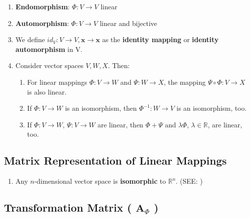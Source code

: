 \begin{enumerate}
    \item \textbf{Endomorphism}: $\Phi : V \to V$ linear

    \item \textbf{Automorphism}: $\Phi : V \to V$ linear and bijective

    \item We define $id_V : V \to V , \mathbf{x} \to \mathbf{x}$ as the \textbf{identity mapping} or \textbf{identity automorphism} in V.

    \item Consider vector spaces $V, W, X$. Then:
    \begin{enumerate}
        \item For linear mappings $\Phi : V \to W$ and $\Psi : W \to X$, the mapping $\Psi \circ \Phi : V \to X$ is also linear.

        \item If $\Phi : V \to W$ is an isomorphism, then $\Phi^{-1} : W \to V$ is an isomorphism, too.

        \item If $\Phi : V \to W$, $\Psi : V \to W$ are linear, then $\Phi + \Psi$ and $\lambda\Phi$, $\lambda \in \mathbb{R}$, are linear, too.
    \end{enumerate}
    
\end{enumerate}

\subsection{Matrix Representation of Linear Mappings \cite{mfml-1}}\label{Matrix Representation of Linear Mappings}

\begin{enumerate}
    \item Any $n$-dimensional vector space is \textbf{isomorphic} to $\mathbb{R}^n$. (SEE: )
    
\end{enumerate}

\subsection{Transformation Matrix ( $\mathbf{A}_\Phi$ ) \cite{mfml-1}}\label{Transformation Matrix}

